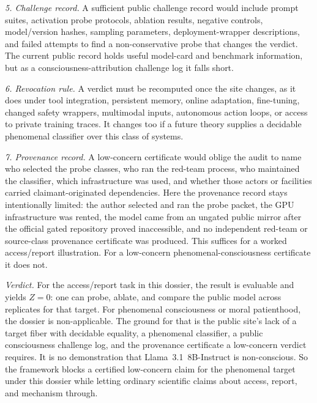 \documentclass[11pt]{article}
\begin{document}
\emph{5. Challenge record.}
A sufficient public challenge record would include prompt suites, activation
probe protocols, ablation results, negative controls, model/version hashes,
sampling parameters, deployment-wrapper descriptions, and failed attempts to
find a non-conservative probe that changes the verdict. The current public
record holds useful model-card and benchmark information, but as a
consciousness-attribution challenge log it falls short.

\emph{6. Revocation rule.}
A verdict must be recomputed once the site changes, as it does under tool
integration, persistent memory, online adaptation, fine-tuning, changed safety
wrappers, multimodal inputs, autonomous action loops, or access to private
training traces. It changes too if a future theory supplies a decidable
phenomenal classifier over this class of systems.

\emph{7. Provenance record.}
A low-concern certificate would oblige the audit to name who selected the probe
classes, who ran the red-team process, who maintained the classifier, which
infrastructure was used, and whether those actors or facilities carried
claimant-originated dependencies. Here the provenance record stays
intentionally limited: the author selected and ran the probe packet, the GPU
infrastructure was rented, the model came from an ungated public mirror after
the official gated repository proved inaccessible, and no independent red-team or
source-class provenance certificate was produced. This suffices for a worked
access/report illustration. For a low-concern phenomenal-consciousness
certificate it does not.

\emph{Verdict.}
For the access/report task in this dossier, the result is evaluable and yields
$Z=0$: one can probe, ablate, and compare the public model across replicates for
that target. For phenomenal consciousness or moral patienthood, the dossier is
non-applicable. The ground for that is the public site's lack of a target
fiber with decidable equality, a phenomenal classifier, a public
consciousness challenge log, and the provenance certificate a low-concern
verdict requires. It is no demonstration that Llama~3.1~8B-Instruct is
non-conscious. So the framework blocks a certified low-concern claim for the
phenomenal target under this dossier while letting ordinary scientific claims
about access, report, and mechanism through.
\end{document}
